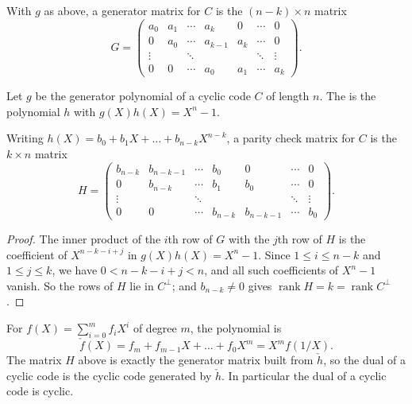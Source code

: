 \documentclass[a4paper]{scrartcl}
\DeclareMathOperator{\rank}{rank}
\begin{document}
\begin{corollary}
	With $g$ as above, a generator matrix for $C$ is the $(n-k)\times n$ matrix
	$$G = \begin{pmatrix}
		a_0 & a_1 & \cdots & a_k & 0 & \cdots & 0\\
		0 & a_0 & \cdots & a_{k-1} & a_k & \cdots & 0\\
		\vdots & & \ddots & & & \ddots & \vdots\\
		0 & 0 & \cdots & a_0 & a_1 & \cdots & a_k
	\end{pmatrix}.$$
\end{corollary}

\begin{definition}
	Let $g$ be the generator polynomial of a cyclic code $C$ of length $n$. The  is the polynomial $h$ with $g(X)h(X) = X^n-1$.
\end{definition}

\begin{corollary}
	Writing $h(X) = b_0+b_1X+\dots+b_{n-k}X^{n-k}$, a parity check matrix for $C$ is the $k\times n$ matrix
	$$H = \begin{pmatrix}
		b_{n-k} & b_{n-k-1} & \cdots & b_0 & 0 & \cdots & 0\\
		0 & b_{n-k} & \cdots & b_1 & b_0 & \cdots & 0\\
		\vdots & & \ddots & & & \ddots & \vdots\\
		0 & 0 & \cdots & b_{n-k} & b_{n-k-1} & \cdots & b_0
	\end{pmatrix}.$$
\end{corollary}

\begin{proof}
	The inner product of the $i$th row of $G$ with the $j$th row of $H$ is the coefficient of $X^{n-k-i+j}$ in $g(X)h(X) = X^n-1$. Since $1 \le i \le n-k$ and $1 \le j \le k$, we have $0 < n-k-i+j< n$, and all such coefficients of $X^n-1$ vanish. So the rows of $H$ lie in $C^\perp$; and $b_{n-k}\ne0$ gives $\rank H = k = \rank C^\perp$.
\end{proof}

\begin{remark}
	For $f(X) = \sum_{i=0}^m f_iX^i$ of degree $m$, the  polynomial is
	$$\check f(X) = f_m + f_{m-1}X+\dots+f_0X^m = X^mf(1/X).$$
	The matrix $H$ above is exactly the generator matrix built from $\check h$, so the dual of a cyclic code is the cyclic code generated by $\check h$. In particular the dual of a cyclic code is cyclic.
\end{remark}
\end{document}
